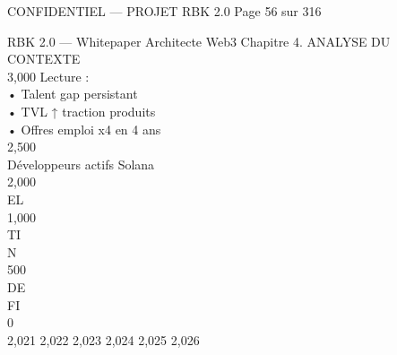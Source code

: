 \vspace{0.5em}
\begin{confidential}CONFIDENTIEL — PROJET RBK 2.0                                            Page 56 sur 316\end{confidential}
RBK 2.0 — Whitepaper Architecte Web3                                                                                                            Chapitre 4. ANALYSE DU CONTEXTE\\
\vspace{0.5em}
\vspace{0.5em}
\vspace{0.5em}
3,000                                                                                Lecture :\\
• Talent gap persistant\\
• TVL ↑ traction produits\\
• Offres emploi x4 en 4 ans\\
2,500\\
Développeurs actifs Solana\\
\vspace{0.5em}
\vspace{0.5em}
\vspace{0.5em}
\vspace{0.5em}
2,000\\
\vspace{0.5em}
\vspace{0.5em}
\vspace{0.5em}
\vspace{0.5em}
EL\\
1,000\\
\vspace{0.5em}
\vspace{0.5em}
\vspace{0.5em}
\vspace{0.5em}
TI\\
N\\
500\\
\vspace{0.5em}
\vspace{0.5em}
\vspace{0.5em}
\vspace{0.5em}
DE\\
FI\\
0\\
2,021          2,022                               2,023                           2,024                             2,025              2,026\\
\vspace{0.5em}
